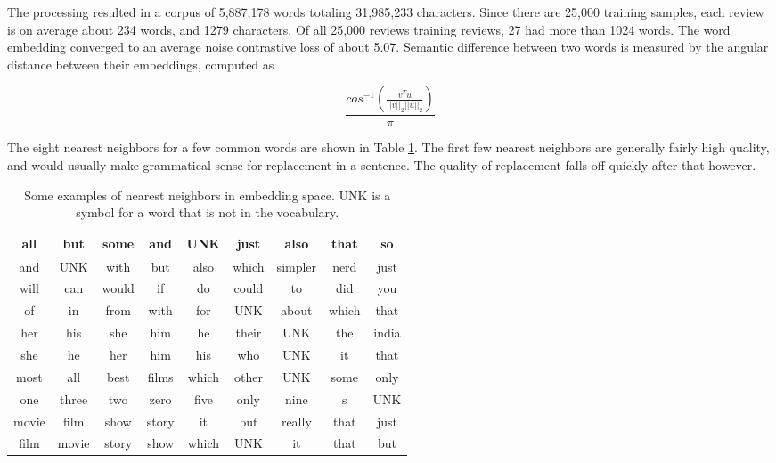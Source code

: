 The processing resulted in a corpus of 5,887,178 words totaling 31,985,233 characters.  Since there are 25,000 training samples, each review is on average about 234 words, and 1279 characters.  Of all 25,000 reviews training reviews, 27 had more than 1024 words.  The word embedding converged to an average noise contrastive loss of about 5.07.   Semantic difference between two words is measured by the angular distance between their embeddings, computed as

$$ \frac{cos^{-1}\left(\frac{v^Tu}{||v||_2||u||_2}\right)}{\pi}$$

\noindent
The eight nearest neighbors for a few common words are shown in Table \ref{tab:nearest_words}.  The first few nearest neighbors are generally fairly high quality, and would usually make grammatical sense for replacement in a sentence.  The quality of replacement falls off quickly after that however.

\begin{table}[h]
\centering
\begin{tabular}{ | c |  c  c  c  c  c  c  c  c | }
    \hline
    all & but& some& and& UNK& just& also& that& so \\ \hline
    and & UNK& with& but& also& which& simpler& nerd& just \\ \hline
    will & can& would& if& do& could& to& did& you \\ \hline
    of & in& from& with& for& UNK& about& which& that \\ \hline
    her & his& she& him& he& their& UNK& the& india \\ \hline
    she & he& her& him& his& who& UNK& it& that \\ \hline
    most & all& best& films& which& other& UNK& some& only \\ \hline
    one & three& two& zero& five& only& nine& s& UNK \\ \hline
    movie & film& show& story& it& but& really& that& just \\ \hline 
    film & movie& story& show& which& UNK& it& that& but \\ \hline
\end{tabular}
\caption{Some examples of nearest neighbors in embedding space.  UNK is a symbol for a word that is not in the vocabulary.}
\label{tab:nearest_words}
\end{table}
